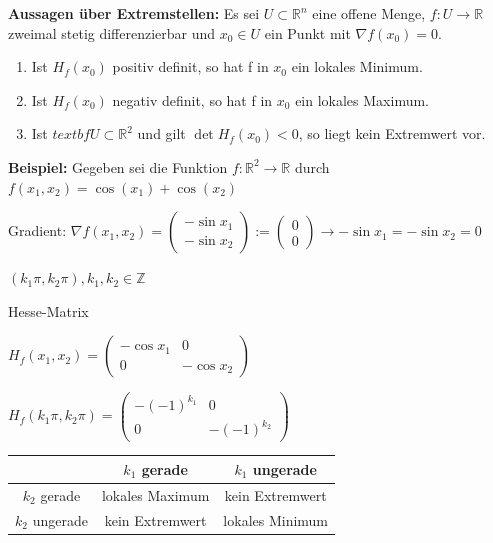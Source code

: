 \documentclass[fontset=ubuntu,12pt,a4paper,fleqn]{article}
\begin{document}
\textbf{Aussagen über Extremstellen:}
Es sei \(U\subset\mathbb{R}^n\) eine offene Menge, \(f:U\to\mathbb{R}\) zweimal stetig differenzierbar und \(x_0\in U\) ein Punkt mit \(\nabla f(x_0)=0\).
\begin{enumerate}
	\item Ist \(H_f(x_0)\) positiv definit, so hat f in \(x_0\) ein lokales Minimum.
	\item Ist \(H_f(x_0)\) negativ definit, so hat f in \(x_0\) ein lokales Maximum.
	\item Ist \(textbf{U\subset\mathbb{R}^2}\) und gilt \(\det H_f(x_0) < 0\), so liegt kein Extremwert vor.
\end{enumerate}

\textbf{Beispiel:}
Gegeben sei die Funktion \(f:\mathbb{R}^2\to\mathbb{R}\) durch \(f(x_1,x_2)=\cos(x_1)+\cos(x_2)\)

Gradient: \(\nabla f(x_1,x_2)=\begin{pmatrix}
-\sin x_1 \\ -\sin x_2
\end{pmatrix} := \begin{pmatrix}
0 \\ 0
\end{pmatrix} \to -\sin x_1 = -\sin x_2 = 0\)

\((k_1\pi,k_2\pi), k_1,k_2\in\mathbb{Z}\)
{\fontsize{9}{10}\begin{multicols}{2}
Hesse-Matrix

\(H_f(x_1,x_2)=\begin{pmatrix}
-\cos x_1 & 0 \\ 0 & -\cos x_2
\end{pmatrix}\)

\(H_f(k_1\pi,k_2\pi)=\begin{pmatrix}
-{(-1)}^{k_1} & 0 \\ 0 & -{(-1)}^{k_2} 
\end{pmatrix}\)

\vspace{1cm}
\def\arraystretch{1.25}	
\begin{tabular}{ c | c | c }
	& \(k_1\) gerade & \(k_1\) ungerade \\ \hline
	\(k_2\) gerade & lokales Maximum & kein Extremwert \\ \hline
	\(k_2\) ungerade & kein Extremwert & lokales Minimum \\ 
\end{tabular}
\end{multicols}}
\newpage
\end{document}
